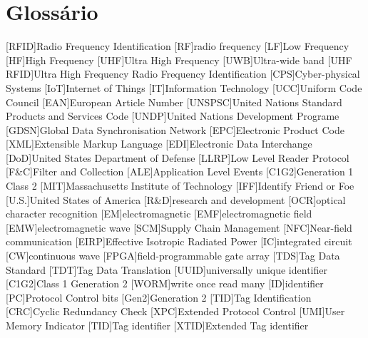 \chapter{Glossário}

\footnotesize
\SingleSpacing

\begin{multicols}{2}
\begin{acronym}[AAAAAA]

	[RFID]{Radio Frequency Identification}
	[RF]{radio frequency}
	[LF]{Low Frequency}
	[HF]{High Frequency}
	[UHF]{Ultra High Frequency}
	[UWB]{Ultra-wide band}
	[UHF RFID]{Ultra High Frequency Radio Frequency Identification}
	[CPS]{Cyber-physical Systems}
	[IoT]{Internet of Things}
	[IT]{Information Technology}
	[UCC]{Uniform Code Council}
	[EAN]{European Article Number}
	[UNSPSC]{United Nations Standard Products and Services Code}
	[UNDP]{United Nations Development Programe}
	[GDSN]{Global Data Synchronisation Network}
	[EPC]{Electronic Product Code}
	[XML]{Extensible Markup Language}
	[EDI]{Electronic Data Interchange}
	[DoD]{United States Department of Defense}
	[LLRP]{Low Level Reader Protocol}
	[F\&C]{Filter and Collection}
	[ALE]{Application Level Events}
	[C1G2]{Generation 1 Class 2}
	[MIT]{Massachusetts Institute of Technology}
	[IFF]{Identify Friend or Foe}
	[U.S.]{United States of America}
	[R\&D]{research and development}
	[OCR]{optical character recognition}
	[EM]{electromagnetic}
	[EMF]{electromagnetic field}
	[EMW]{electromagnetic wave}
	[SCM]{Supply Chain Management}
	[NFC]{Near-field communication}
	[EIRP]{Effective Isotropic Radiated Power}
	[IC]{integrated circuit}
	[CW]{continuous wave}
	[FPGA]{field-programmable gate array}
	[TDS]{Tag Data Standard}
	[TDT]{Tag Data Translation}
	[UUID]{universally unique identifier}
	[C1G2]{Class 1 Generation 2}
	[WORM]{write once read many}
	[ID]{identifier}
	[PC]{Protocol Control bits}
	[Gen2]{Generation 2}
	[TID]{Tag Identification}
	[CRC]{Cyclic Redundancy Check}
	[XPC]{Extended Protocol Control}
	[UMI]{User Memory Indicator}
	[TID]{Tag identifier}
	[XTID]{Extended Tag identifier}

\end{acronym}
\end{multicols}
